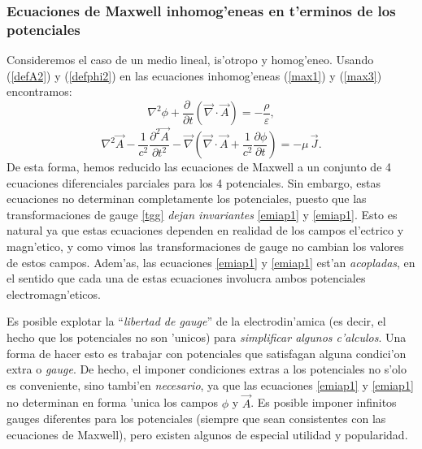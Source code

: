 \subsubsection{Ecuaciones de Maxwell inhomog'eneas en t'erminos de los
potenciales}
Consideremos el caso de un medio lineal, is'otropo y homog'eneo. Usando (\ref{defA2}) y (\ref{defphi2}) en las ecuaciones inhomog'eneas (\ref{max1}) y (\ref{max3}) encontramos:
\begin{equation}\label{emiap1}
 \nabla^2\phi+\frac{\partial\ }{\partial t}\left(\vec{\nabla}\cdot\vec{A}\right)=-\frac{\rho}{\varepsilon},
\end{equation}
\begin{equation}\label{emiap2}
 \nabla^2\vec{A}-\frac{1}{c^2}\frac{\partial^2\vec{A}}{\partial t^2}-\vec{\nabla}\left(\vec{\nabla}\cdot\vec{A}+\frac{1}{c^2}\frac{\partial\phi }{\partial t}\right)=-\mu\,\vec{J}.
\end{equation}
De esta forma, hemos reducido las ecuaciones de Maxwell a un conjunto de 4 ecuaciones diferenciales parciales para los 4 potenciales. Sin embargo, estas ecuaciones no determinan completamente los potenciales, puesto que las transformaciones de gauge \eqref{tgg} \textit{dejan invariantes} \eqref{emiap1} y \eqref{emiap1}. Esto es natural ya que estas ecuaciones dependen en realidad de los campos el'ectrico y magn'etico, y como vimos las transformaciones de gauge no cambian los valores de estos campos. Adem'as, las ecuaciones \eqref{emiap1} y \eqref{emiap1} est'an \textit{acopladas}, en el sentido que cada una de estas ecuaciones involucra ambos potenciales electromagn'eticos.

Es posible explotar la ``\textit{libertad de gauge}'' de la electrodin'amica (es decir, el hecho que los potenciales no son 'unicos) para \textit{simplificar algunos c'alculos}. Una forma de hacer esto es trabajar con potenciales que satisfagan alguna condici'on extra o \textit{gauge}. De hecho, el imponer condiciones extras a los potenciales no s'olo es conveniente, sino tambi'en \textit{necesario}, ya que las ecuaciones \eqref{emiap1} y \eqref{emiap1} no determinan en forma 'unica los campos $\phi$ y $\vec{A}$. Es posible imponer infinitos gauges diferentes para los potenciales (siempre que sean consistentes con las ecuaciones de Maxwell), pero existen algunos de especial utilidad y popularidad.

